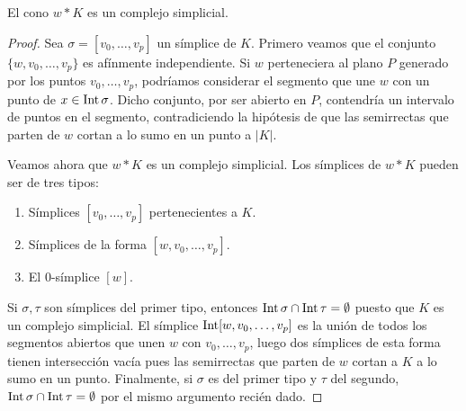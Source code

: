 \begin{lema}
	El cono \(w \ast K\) es un complejo simplicial.
\end{lema}
\begin{proof}
	Sea \(\sigma = [v_{0},\ldots,v_{p}]\) un símplice de \(K\). Primero veamos que el
	conjunto \(\{w,v_{0},\ldots,v_{p}\}\) es afínmente independiente. Si \(w\) perteneciera
	al plano \(P\) generado por los puntos \(v_{0},\ldots,v_{p}\), podríamos
	considerar el segmento que une \(w\) con un punto de \(x \in \operatorname{Int} \sigma\). Dicho
	conjunto, por ser abierto en \(P\), contendría un intervalo de puntos en el segmento,
	contradiciendo la hipótesis de que las semirrectas que parten de \(w\) cortan a
	lo sumo en un punto a \(|K|\).
	
	Veamos ahora que \(w \ast K\) es un complejo simplicial. Los símplices de \(w \ast
	K\) pueden ser de tres tipos:
	\begin{enumerate}
		\item Símplices \([v_{0},\ldots, v_{p}]\) pertenecientes a \(K\).
		
		\item Símplices de la forma \([w,v_{0},\ldots, v_{p}]\).
		
		\item El \(0\)-símplice \([w]\).
	\end{enumerate}
	Si \(\sigma,\tau\) son símplices del primer tipo, entonces \(\operatorname{Int} \sigma \cap
	\operatorname{Int} \tau = \emptyset\) puesto que \(K\) es un complejo simplicial. El
	símplice \(\operatorname{Int} [w,v_{0},\ldots,v_{p}]\) es la unión de todos los segmentos
	abiertos que unen \(w\) con \(v_{0},\ldots, v_{p}\), luego dos símplices de esta forma
	tienen intersección vacía pues las semirrectas que parten de \(w\) cortan a \(K\) a
	lo sumo en un punto. Finalmente, si \(\sigma\) es del primer tipo y \(\tau\) del segundo,
	\(\operatorname{Int} \sigma \cap \operatorname{Int} \tau = \emptyset\) por el mismo argumento
	recién dado.
\end{proof}

